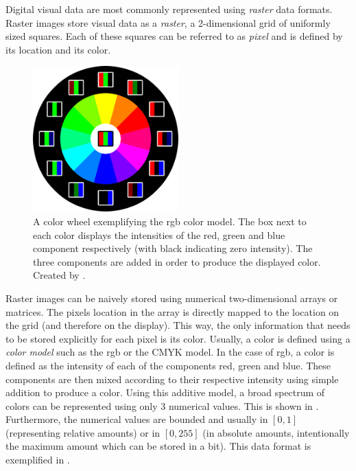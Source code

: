 Digital visual data are most commonly represented using \emph{raster} data formats. Raster images store visual data as a \emph{raster}, a 2-dimensional grid of uniformly sized squares. Each of these squares can be referred to as \emph{pixel} and is defined by its location and its color.

\begin{figure}
    \centering
    \includegraphics[width=0.5\textwidth]{graphics/RGB_color_wheel_pixel_30.pdf}
    \caption{A color wheel exemplifying the \gls{rgb} color model. The box next to each color displays the intensities of the red, green and blue component respectively (with black indicating zero intensity). The three components are added in order to produce the displayed color. Created by \citet{nemethcolorwheel}.}
    \label{fig:rgb}
\end{figure}

Raster images can be naively stored using numerical two-dimensional arrays or matrices. The pixels location in the array is directly mapped to the location on the grid (and therefore on the display). This way, the only information that needs to be stored explicitly for each pixel is its color. Usually, a color is defined using a \emph{color model} such as the \gls{rgb} or the CMYK model. In the case of \gls{rgb}, a color is defined as the intensity of each of the components red, green and blue. These components are then mixed according to their respective intensity using simple addition to produce a color. Using this additive model, a broad spectrum of colors can be represented using only 3 numerical values. This is shown in . Furthermore, the numerical values are bounded and usually in $[0,1]$ (representing relative amounts) or in $[0,255]$ (in absolute amounts, intentionally the maximum amount which can be stored in a bit). This data format is exemplified in .

